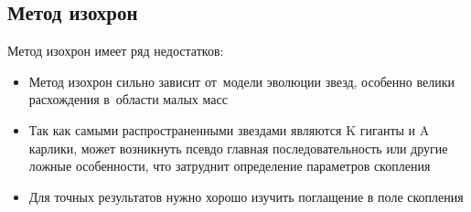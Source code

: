 \documentclass{beamer}
\begin{document}
\begin{frame}
\begin{columns}
\begin{column}{0.333\textwidth}
\begin{figure}
                \end{figure}
            \end{column}
        \end{columns}
    \end{frame}
    \subsection*{Метод изохрон}
    \begin{frame}
        Метод изохрон имеет ряд недостатков:
        \begin{itemize}
            \item Метод изохрон сильно зависит от~модели эволюции звезд, особенно велики расхождения в~области малых масс
            \item Так как самыми распространенными звездами являются K гиганты и A карлики, 
            может возникнуть псевдо главная последовательность или другие ложные особенности, что затруднит определение параметров скопления
            \item Для точных результатов нужно хорошо изучить поглащение в поле скопления
        \end{itemize}
    \end{frame}

\end{document}
